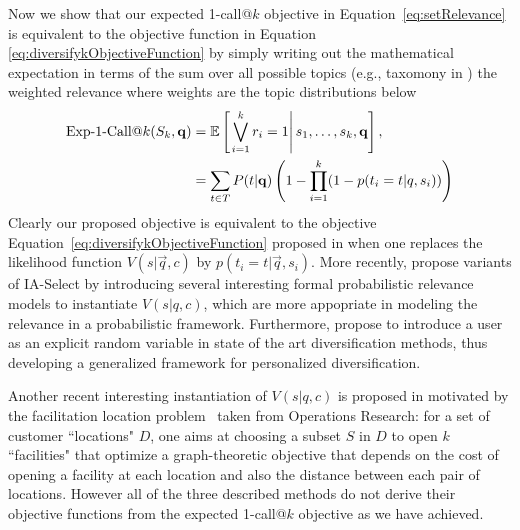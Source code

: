 Now we show that our expected 1-call@$k$ objective in
Equation~\eqref{eq:setRelevance} is equivalent to the objective
function in Equation \eqref{eq:diversifykObjectiveFunction} by simply
writing out the mathematical expectation in terms of the sum over all
possible topics (e.g., taxomony in \cite{agrawal09diversifying}) the
weighted relevance where weights are the topic distributions below
\begin{align*}
    \ExpOneCall(S_k,\vec{q}) & = \mathbb{E} \left[\left. \bigvee_{i=1}^{k}r_i=1 \right| s_{1},\dots, s_{k},\vec{q} \right], \\
    												 & = \sum_{t\in T} P(t|\vec{q}) \left( 1 - \prod_{i=1}^{k}(1-p(t_i = t| q, s_i))\right) 
\end{align*}
Clearly our proposed objective is equivalent to the objective
Equation~\eqref{eq:diversifykObjectiveFunction} proposed
in \cite{agrawal09diversifying} when one replaces the likelihood
function $V(s|\vec{q}, c)$ by $p(t_i = t| \vec{q}, s_i)$. More
recently, \cite{Vargas:SIGIR2012} propose variants of
IA-Select by introducing several interesting formal probabilistic
relevance models to instantiate $V(s| q, c)$, which are more
appopriate in modeling the relevance in a probabilistic
framework. Furthermore, \cite{Vallet:SIGIR2012} propose to introduce a
user as an explicit random variable in state of the art
diversification methods, thus developing a generalized framework for
personalized diversification.

Another recent interesting instantiation of $V(s|q,c)$ is proposed
in \cite{Zuccon:ECIR2012} motivated by the facilitation location
problem~\cite{Gonzalez:Handbook2007} taken from Operations Research:
for a set of customer ``locations" $D$, one aims at choosing a subset
$S$ in $D$ to open $k$ ``facilities" that optimize a graph-theoretic
objective that depends on the cost of opening a facility at each
location and also the distance between each pair of locations. However
all of the three described methods do not derive their objective
functions from the expected 1-call@$k$ objective as we have achieved.

